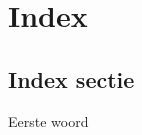 \chapter{Index}
\label{index}

\section{Index sectie}

\blindtext
\newline

Eerste woord
\newline

\blindtext

